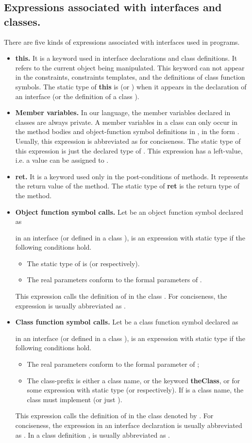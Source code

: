 \documentclass[fleqn]{llncs}
\begin{document}
\subsection{Expressions associated with interfaces and classes.}
There are five kinds of expressions associated with interfaces used in programs.
\begin{itemize}
\item \textbf{this.} It is a keyword used in interface declarations and class definitions. It refers to the current object being manipulated.
    This keyword can not appear in the constraints, constraints templates,
    and the definitions of class function symbols.
The static type of \textbf{this} is  (or  ) when it appears in the declaration of an interface  (or the definition of a class ).
\item \textbf{Member variables.} In our language, the member variables declared in classes are always private.
     A member variables  in a class  can only occur in the method bodies and object-function symbol definitions
    in , in the form . Usually, this expression is abbreviated as  for conciseness. The static type of this expression is just the declared type of . This expression has a left-value, i.e. a value can be assigned to .
\item \textbf{ret.} It is a keyword used only in the post-conditions of methods. It represents the return value of the method. The static type of \textbf{ret} is the return type of the method.
\item \textbf{Object function symbol calls.} Let  be an object function symbol declared as
                
    in an interface  (or defined in a class ),  is an expression with static type  if the following conditions hold.
    \begin{itemize}
    \item The static type of  is  (or  respectively).
    \item The real parameters  conform to the formal parameters  of .
    \end{itemize}
    This expression calls the definition of  in the class .
    For conciseness, the expression  is usually abbreviated as .
\item \textbf{Class function symbol calls.} Let  be a class function symbol declared as
                
    in an interface  (or defined in a class ),  is an expression with static type  if the following conditions hold.
    \begin{itemize}
    \item The real parameters  conform to the formal parameter  of ;
    \item The class-prefix  is either a class name, or the keyword \textbf{theClass}, or  for some expression  with static type  (or  respectively).  If  is a class name, the class must implement  (or just ).
    \end{itemize}
    This expression calls the definition of  in the class denoted by .
For conciseness, the expression  in an interface declaration is usually abbreviated as . In a class definition ,  is usually abbreviated as .
\end{itemize}
\end{document}
